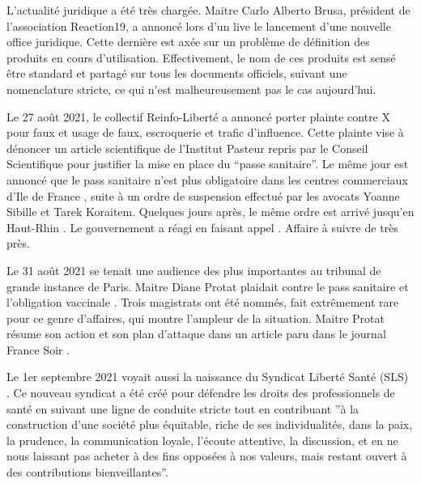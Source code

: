 \documentclass[a4paper]{article}
\begin{document}
\begin{multicols}{3}
  \closearticle


  L'actualité juridique a été très chargée. Maitre Carlo Alberto
  Brusa, président de l'association Reaction19, a annoncé lors d'un
  live \cite{Reaction19:JuridiqueNommage} le lancement d'une nouvelle
  office juridique. Cette dernière est axée sur un problème de
  définition des produits en cours d'utilisation. Effectivement, le
  nom de ces produits est sensé être standard et partagé sur tous les
  documents officiels, suivant une nomenclature stricte, ce qui n'est
  malheureusement pas le cas aujourd'hui.

  Le 27 août 2021, le collectif Reinfo-Liberté a annoncé porter
  plainte contre X \cite{ReinfoLiberte:PlainteX} pour faux et usage de
  faux, escroquerie et trafic d’influence. Cette plainte vise à
  dénoncer un article scientifique de l'Institut Pasteur repris par le
  Conseil Scientifique pour justifier la mise en place du ``passe
  sanitaire''. Le même jour est annoncé que le pass sanitaire n'est
  plus obligatoire dans les centres commerciaux d'Ile de France
  \cite{CourrierDuSoir:SuspensionPassIdf}, suite à un ordre de
  suspension effectué par les avocats Yoanne Sibille et Tarek
  Koraitem. Quelques jours après, le même ordre est arrivé jusqu'en
  Haut-Rhin \cite{SudOuest:SuspensionPassHautRhin}. Le gouvernement a
  réagi en faisant appel \cite{}. Affaire à suivre de très près.

  Le 31 août 2021 se tenait une audience des plus importantes au
  tribunal de grande instance de Paris. Maitre Diane Protat plaidait
  contre le pass sanitaire et l'obligation vaccinale
  \cite{FranceSoir:MeProtatAudience}. Trois magistrats ont été nommés,
  fait extrêmement rare pour ce genre d'affaires, qui montre l'ampleur
  de la situation. Maitre Protat résume son action et son plan
  d'attaque dans un article paru dans le journal France Soir
  \cite{FranceSoir:MeProtatDebrief}.

  Le 1er septembre 2021 voyait aussi la naissance du Syndicat Liberté
  Santé (SLS) \cite{SyndicatLiberteSante:Naissance}. Ce nouveau
  syndicat a été créé pour défendre les droits des professionnels de
  santé en suivant une ligne de conduite stricte tout en contribuant
  ”à la construction d’une société plus équitable, riche de ses
  individualités, dans la paix, la prudence, la communication loyale,
  l’écoute attentive, la discussion, et en ne nous laissant pas
  acheter à des fins opposées à nos valeurs, mais restant ouvert à des
  contributions bienveillantes''.


\end{multicols}
\end{document}

